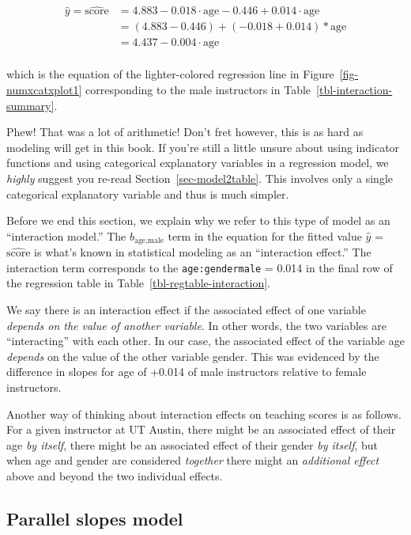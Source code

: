 \documentclass[
  letterpaper,
  DIV=11,
  numbers=noendperiod]{scrreprt}
\theoremstyle{definition}
\theoremstyle{remark}
\begin{document}
\[
\begin{aligned}
\widehat{y} = \widehat{\text{score}} &= 4.883 - 0.018   \cdot \mbox{age} - 0.446 + 0.014 \cdot \mbox{age}\\
&= (4.883 - 0.446) + (- 0.018 + 0.014) * \mbox{age}\\
&= 4.437 - 0.004    \cdot \mbox{age}\\
\end{aligned}
\]

which is the equation of the lighter-colored regression line in
Figure~\ref{fig-numxcatxplot1} corresponding to the male instructors in
Table~\ref{tbl-interaction-summary}.

Phew! That was a lot of arithmetic! Don't fret however, this is as hard
as modeling will get in this book. If you're still a little unsure about
using indicator functions and using categorical explanatory variables in
a regression model, we \emph{highly} suggest you re-read
Section~\ref{sec-model2table}. This involves only a single categorical
explanatory variable and thus is much simpler.

Before we end this section, we explain why we refer to this type of
model as an ``interaction model.'' The \(b_{\mbox{age,male}}\) term in
the equation for the fitted value \(\widehat{y}\) =
\(\widehat{\text{score}}\) is what's known in statistical modeling as an
``interaction effect.'' The interaction term corresponds to the
\texttt{age:gendermale} = 0.014 in the final row of the regression table
in Table~\ref{tbl-regtable-interaction}.

We say there is an interaction effect if the associated effect of one
variable \emph{depends on the value of another variable}. In other
words, the two variables are ``interacting'' with each other. In our
case, the associated effect of the variable age \emph{depends} on the
value of the other variable gender. This was evidenced by the difference
in slopes for age of +0.014 of male instructors relative to female
instructors. 

Another way of thinking about interaction effects on teaching scores is
as follows. For a given instructor at UT Austin, there might be an
associated effect of their age \emph{by itself}, there might be an
associated effect of their gender \emph{by itself}, but when age and
gender are considered \emph{together} there might an \emph{additional
effect} above and beyond the two individual effects.

\hypertarget{sec-model4table}{%
\subsection{Parallel slopes model}\label{sec-model4table}}
\end{document}
